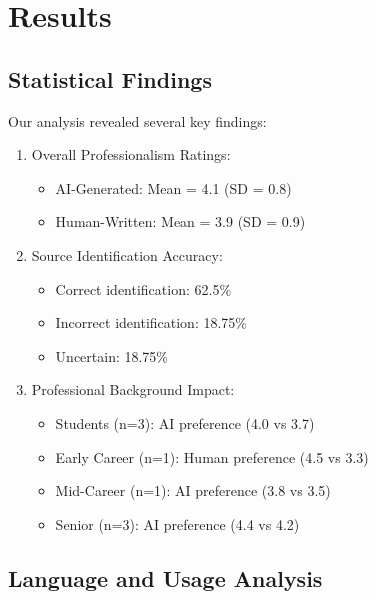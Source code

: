 \documentclass[
]{article}
\providecommand{\tightlist}{%
  \setlength{\itemsep}{0pt}\setlength{\parskip}{0pt}}\usepackage{longtable,booktabs,array}
\begin{document}
\section{Results}\label{results}

\subsection{Statistical Findings}\label{statistical-findings}

Our analysis revealed several key findings:

\begin{enumerate}
\def\labelenumi{\arabic{enumi}.}
\tightlist
\item
  Overall Professionalism Ratings:

  \begin{itemize}
  \tightlist
  \item
    AI-Generated: Mean = 4.1 (SD = 0.8)
  \item
    Human-Written: Mean = 3.9 (SD = 0.9)
  \end{itemize}
\item
  Source Identification Accuracy:

  \begin{itemize}
  \tightlist
  \item
    Correct identification: 62.5\%
  \item
    Incorrect identification: 18.75\%
  \item
    Uncertain: 18.75\%
  \end{itemize}
\item
  Professional Background Impact:

  \begin{itemize}
  \tightlist
  \item
    Students (n=3): AI preference (4.0 vs 3.7)
  \item
    Early Career (n=1): Human preference (4.5 vs 3.3)
  \item
    Mid-Career (n=1): AI preference (3.8 vs 3.5)
  \item
    Senior (n=3): AI preference (4.4 vs 4.2)
  \end{itemize}
\end{enumerate}

\subsection{Language and Usage
Analysis}\label{language-and-usage-analysis}
\end{document}

